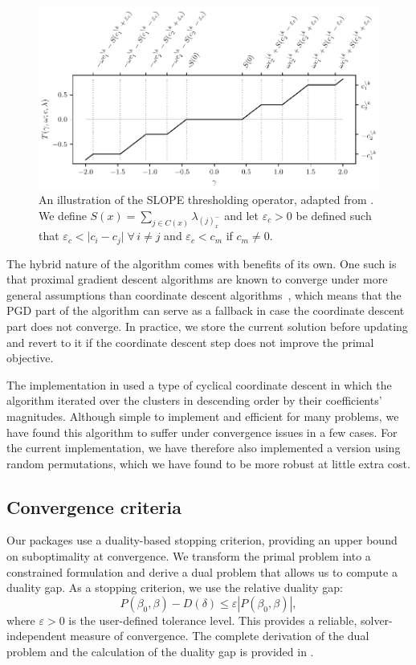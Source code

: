 \documentclass[article]{jss}
\makeatletter
\let\Cref\crtCref
\let\natwidth\Gin@nat@width
\makeatother
\begin{document}
\begin{figure}[t]
  \centering
  \includegraphics[width=\natwidth]{images/slope-thresholding.pdf}
  \caption{
  An illustration of the SLOPE thresholding operator, adapted from
  \citet{larsson2023}. We define \(S(x) = \sum_{j \in
    C(x)}\lambda_{(j)^-_{x}}\) and let \(\varepsilon_c > 0\) be defined such that
  \(\varepsilon_c < \big| c_i - c_j\big|\;\forall\, i \neq j\) and
  \(\varepsilon_c < c_m\) if \(c_m \neq 0\).
  }
  \label{fig:slope-thresholding}
\end{figure}

The hybrid nature of the algorithm comes with benefits of its own. One such is
that proximal gradient descent algorithms are known to converge under more
general assumptions than coordinate descent algorithms~\citep{wright2015},
which means that the PGD part of the algorithm can serve as a fallback in case
the coordinate descent part does not converge. In practice, we store the
current solution before updating and revert to it if the coordinate descent
step does not improve the primal objective.

The implementation in \citet{larsson2023} used a type of cyclical coordinate
descent in which the algorithm iterated over the clusters in descending order
by their coefficients' magnitudes. Although simple to implement
and efficient for many problems, we have found this
algorithm to suffer under convergence issues in a few cases.
For the current implementation, we have therefore also
implemented a version using random permutations, which we have found to be more
robust at little extra cost.

\subsection{Convergence criteria}

Our packages use a duality-based stopping criterion, providing an upper bound
on suboptimality at convergence. We transform the primal problem into a
constrained formulation and derive a dual problem that allows us to compute a
duality gap. As a stopping criterion, we use the relative duality gap: \[
  P(\beta_0, \beta) - D(\delta) \leq \varepsilon | P(\beta_0, \beta) |, \] where
\(\varepsilon >0\) is the user-defined tolerance level. This provides a
reliable, solver-independent measure of convergence. The complete derivation of
the dual problem and the calculation of the duality gap is provided in
\Cref{sec:convergence-criteria-details}.
\end{document}
